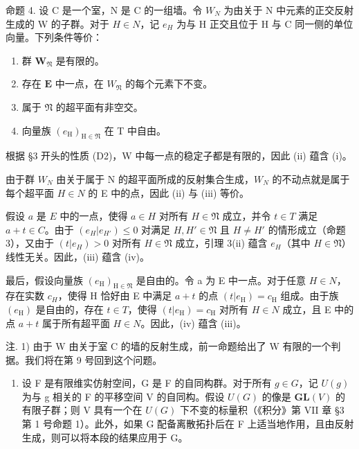 命题 4. 设 C 是一个室，N 是 C 的一组墙。令 \(W_{N}\) 为由关于 N 中元素的正交反射生成的 W 的子群。对于 \(H \in N\)，记 \(e_{H}\) 为与 H 正交且位于 H 与 C 同一侧的单位向量。下列条件等价：

\begin{enumerate}
\def\labelenumi{(\roman{enumi})}
\item
群 \(\mathbf{W}_{\mathfrak{N}}\) 是有限的。
\item
存在 \(\mathbf{E}\) 中一点，在 \(W_{\mathfrak{N}}\) 的每个元素下不变。
\item
属于 \(\mathfrak{N}\) 的超平面有非空交。
\item
向量族 \((e_{\mathrm{H}})_{\mathrm{H}\in \mathfrak{N}}\) 在 T 中自由。
\end{enumerate}

根据 §3 开头的性质 (D2)，W 中每一点的稳定子都是有限的，因此 (ii) 蕴含 (i)。

由于群 \(W_{N}\) 由关于属于 N 的超平面所成的反射集合生成，\(W_{N}\) 的不动点就是属于每个超平面 \(H \in N\) 的 E 中的点，因此 (ii) 与 (iii) 等价。

假设 \(a\) 是 \(E\) 中的一点，使得 \(a \in H\) 对所有 \(H \in \mathfrak{N}\) 成立，并令 \(t \in T\) 满足 \(a + t \in C\)。由于 \((e_H | e_{H'}) \leqslant 0\) 对满足 \(H, H' \in \mathfrak{N}\) 且 \(H \neq H'\) 的情形成立（命题 3），又由于 \((t | e_H) > 0\) 对所有 \(H \in \mathfrak{N}\) 成立，引理 3(ii) 蕴含 \(e_H\)（其中 \(H \in \mathfrak{N}\)）线性无关。因此，(iii) 蕴含 (iv)。

最后，假设向量族 \((e_{\mathrm{H}})_{\mathrm{H}\in\mathfrak{N}}\) 是自由的。令 a 为 E 中一点。对于任意 \(H\in N\)，存在实数 \(c_{H}\)，使得 H 恰好由 E 中满足 \(a+t\) 的点 \((t|e_{\mathrm{H}})=c_{\mathrm{H}}\) 组成。由于族 \((e_{\mathrm{H}})\) 是自由的，存在 \(t\in T\)，使得 \((t|e_{\mathrm{H}})=c_{\mathrm{H}}\) 对所有 \(H\in N\) 成立，且 E 中的点 \(a+t\) 属于所有超平面 \(H\in N\)。因此，(iv) 蕴含 (iii)。

注. 1) 由于 W 由关于室 C 的墙的反射生成，前一命题给出了 W 有限的一个判据。我们将在第 9 号回到这个问题。

\begin{enumerate}
\def\labelenumi{\arabic{enumi})}
\setcounter{enumi}{1}
\tightlist
\item
设 F 是有限维实仿射空间，G 是 F 的自同构群。对于所有 \(g \in G\)，记 \(U(g)\) 为与 g 相关的 F 的平移空间 V 的自同构。假设 \(U(G)\) 的像是 \(\mathbf{GL}(V)\) 的有限子群；则 V 具有一个在 \(U(G)\) 下不变的标量积（《积分》第 VII 章 §3 第 1 号命题 1）。此外，如果 G 配备离散拓扑后在 F 上适当地作用，且由反射生成，则可以将本段的结果应用于 G。
\end{enumerate}

